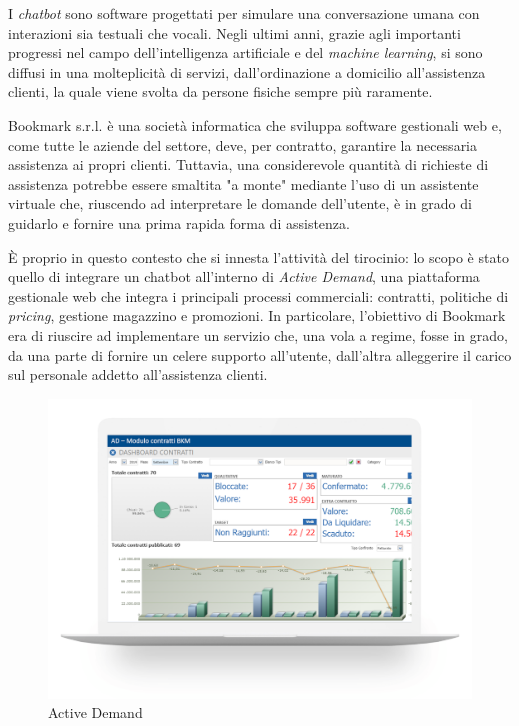 I \textit{chatbot} sono software progettati per simulare una conversazione umana con interazioni sia testuali che vocali.
%
Negli ultimi anni, grazie agli importanti progressi nel campo dell'intelligenza artificiale e del \textit{machine learning}, si sono diffusi in una molteplicità di servizi, dall'ordinazione a domicilio all'assistenza clienti, la quale viene svolta da persone fisiche sempre più raramente.

Bookmark s.r.l. è una società informatica che sviluppa software gestionali web e, come tutte le aziende del settore, deve, per contratto, garantire la necessaria assistenza ai propri clienti. 
%
Tuttavia, una considerevole quantità di richieste di assistenza potrebbe essere smaltita "a monte" mediante l'uso di un assistente virtuale che, riuscendo ad interpretare le domande dell'utente, è in grado di guidarlo e fornire una prima rapida forma di assistenza.

\`E proprio in questo contesto che si innesta l'attività del tirocinio: lo scopo è stato quello di integrare un chatbot all'interno di \textit{Active Demand}, una piattaforma gestionale web che integra i principali processi commerciali: contratti, politiche di \textit{pricing}, gestione magazzino e promozioni.
%
In particolare, l'obiettivo di Bookmark era di riuscire ad implementare un servizio che, una vola a regime, fosse in grado, da una parte di fornire un celere supporto all'utente, dall'altra alleggerire il carico sul personale addetto all'assistenza clienti.

\begin{figure}
    \centering{}
    \includegraphics*[width=\textwidth]{./img/ad.png}
    \caption{Active Demand}
    \label{img:ad}
\end{figure}

